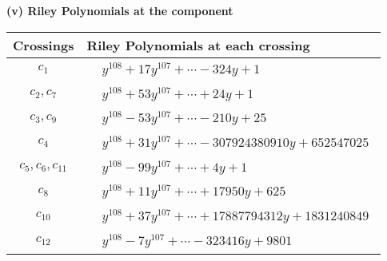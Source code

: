 \documentclass[1p]{elsarticle_modified}
\theoremstyle{definition}
\begin{document}
\newpage\renewcommand{\arraystretch}{1}
\flushleft \textbf{(v) Riley Polynomials at the component}\newline \\
\begin{tabular}{m{50pt}|m{274pt}}
Crossings & \hspace{64pt}Riley Polynomials at each crossing \\
\hline $$\begin{aligned}c_{1}\end{aligned}$$&$\begin{aligned}
&y^{108}+17 y^{107}+\cdots-324 y+1
\end{aligned}$\\
\hline $$\begin{aligned}c_{2},c_{7}\end{aligned}$$&$\begin{aligned}
&y^{108}+53 y^{107}+\cdots+24 y+1
\end{aligned}$\\
\hline $$\begin{aligned}c_{3},c_{9}\end{aligned}$$&$\begin{aligned}
&y^{108}-53 y^{107}+\cdots-210 y+25
\end{aligned}$\\
\hline $$\begin{aligned}c_{4}\end{aligned}$$&$\begin{aligned}
&y^{108}+31 y^{107}+\cdots-307924380910 y+652547025
\end{aligned}$\\
\hline $$\begin{aligned}c_{5},c_{6},c_{11}\end{aligned}$$&$\begin{aligned}
&y^{108}-99 y^{107}+\cdots+4 y+1
\end{aligned}$\\
\hline $$\begin{aligned}c_{8}\end{aligned}$$&$\begin{aligned}
&y^{108}+11 y^{107}+\cdots+17950 y+625
\end{aligned}$\\
\hline $$\begin{aligned}c_{10}\end{aligned}$$&$\begin{aligned}
&y^{108}+37 y^{107}+\cdots+17887794312 y+1831240849
\end{aligned}$\\
\hline $$\begin{aligned}c_{12}\end{aligned}$$&$\begin{aligned}
&y^{108}-7 y^{107}+\cdots-323416 y+9801
\end{aligned}$\\
\hline
\end{tabular}\\~\\
\end{document}
